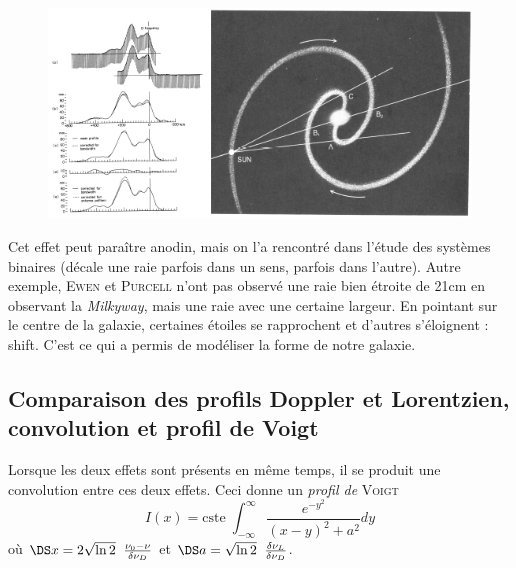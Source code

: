 	\begin{figure}
	\vspace{-5mm}
	\includegraphics[scale=0.4]{ch1/image14}
	\end{figure}
Cet effet peut paraître anodin, mais on l'a rencontré dans l'étude
des systèmes binaires (décale une raie parfois dans un sens, parfois dans l'autre). Autre exemple,
\textsc{Ewen} et \textsc{Purcell} n'ont pas observé une raie bien étroite de 21cm en observant la
\textit{Milkyway}, mais une raie avec une certaine largeur. En pointant sur le centre de la 
galaxie, certaines étoiles se rapprochent et d'autres s'éloignent : shift. C'est ce qui a permis de
modéliser la forme de notre galaxie.


\subsection{Comparaison des profils Doppler et Lorentzien, convolution et profil de Voigt}
Lorsque les deux effets sont présents en même temps, il se produit une convolution entre ces deux effets. Ceci donne un \textit{profil de} \textsc{Voigt}
\begin{equation}
I(x) = \mbox{cste} \; 
\int_{-\infty}^\infty 
\frac{e^{-y^2}}{(x-y)^2 + a^2} dy
\end{equation}
où $\DS x = 2 \sqrt{ \ln 2} \; \;
\frac{\nu_0 - \nu}{\delta \nu_D}$ et $\DS a =  \sqrt{ \ln 2} \; \; 
\frac{\delta \nu_L}{\delta \nu_D}$.